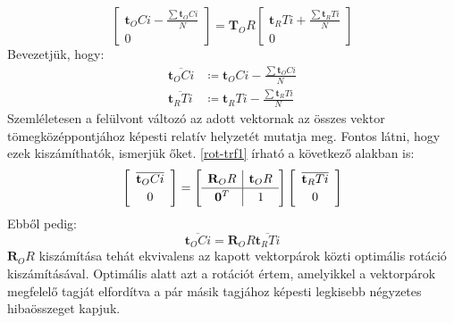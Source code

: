 \documentclass{article}
\begin{document}
	\begin{equation}
	\label{rot-trf1}
	\left[
	\begin{array}{c}
	 	\mathbf{t}_OCi - \frac{\sum \mathbf{t}_OCi}{N}\\
		0
	\end{array}
	\right]	
	 = \mathbf{T}_OR 
	 \left[
	\begin{array}{c}
	\mathbf{t}_RTi + \frac{\sum \mathbf{t}_RTi}{N} \\ 0
	\end{array}	
	 \right]
	\end{equation}	
	Bevezetjük, hogy:
	\begin{equation*}
	\begin{split}
	 	\overline{\mathbf{t}_OCi} &\coloneqq \mathbf{t}_OCi - \frac{\sum \mathbf{t}_OCi}{N} \\
	 	\overline{\mathbf{t}_RTi} &\coloneqq \mathbf{t}_RTi - \frac{\sum \mathbf{t}_RTi}{N} 
	 	\end{split}
	\end{equation*}
	Szemléletesen a felülvont változó az adott vektornak az összes vektor tömegközéppontjához képesti relatív helyzetét mutatja meg. Fontos látni, hogy ezek kiszámíthatók, ismerjük őket. \eqref{rot-trf1} írható a következő alakban is:
	\begin{equation}
	\left[
	\begin{array}{c}
	 	\overline{\mathbf{t}_OCi}\\
		0
	\end{array}
	\right]	
	 = \left[
	\def\arraystretch{1.2}
	\begin{array}{c|c}
 	\mathbf{R}_OR & \mathbf{t}_OR \\
 	\hline
	\mathbf{0}^T & 1 
	\end{array}	
	\right]
	 \left[
	\begin{array}{c}
	\overline{\mathbf{t}_RTi} \\ 0
	\end{array}	
	 \right]
	\end{equation}
	Ebből pedig:
	\begin{equation}
 	\overline{\mathbf{t}_OCi}	= \mathbf{R}_OR 	\overline{\mathbf{t}_RTi}
	\end{equation}
	$\mathbf{R}_OR$ kiszámítása tehát ekvivalens az kapott vektorpárok közti optimális rotáció kiszámításával. Optimális alatt azt a rotációt értem, amelyikkel a vektorpárok megfelelő tagját elfordítva a pár másik tagjához képesti legkisebb négyzetes hibaösszeget kapjuk.
	
\end{document}
